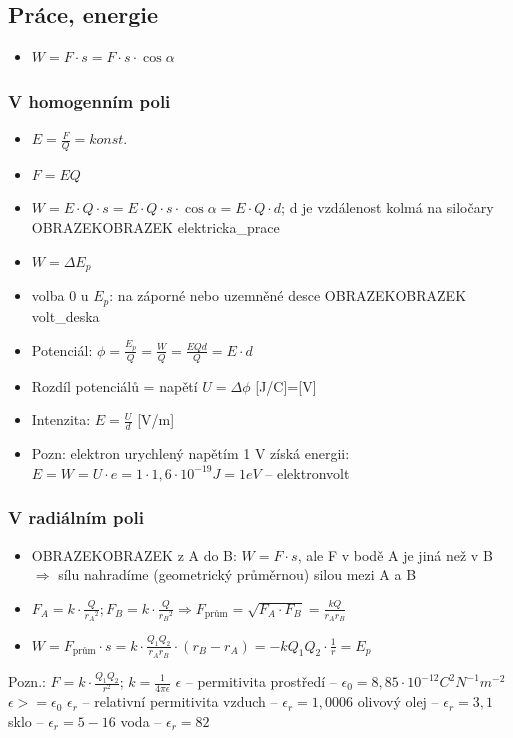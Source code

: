 \documentclass{article}
\begin{document}
\subsection{Práce, energie}
\begin{itemize}
  \item $W = F\cdot s = F\cdot s\cdot \cos \alpha $
\end{itemize}
\subsubsection{V homogenním poli}
\begin{itemize}
  \item $E = \frac{F}{Q} = konst.$
  \item $F = EQ$
  \item $W = E\cdot Q\cdot s = E\cdot Q\cdot s\cdot \cos \alpha = E\cdot Q\cdot d$; d je vzdálenost kolmá na siločary OBRAZEKOBRAZEK elektricka\_prace
  \item $W = \Delta E_p$
  \item volba 0 u $E_p$: na záporné nebo uzemněné desce OBRAZEKOBRAZEK volt\_deska
  \item Potenciál: $\phi = \frac{E_p}{Q} = \frac{W}{Q} = \frac{EQd}{Q} = E\cdot d$
  \item Rozdíl potenciálů = napětí $U = \Delta \phi$ [J/C]=[V]
  \item Intenzita: $E=\frac{U}{d}$ [V/m]
  \item Pozn: elektron urychlený napětím 1 V získá energii: $E = W = U\cdot e = 1\cdot 1,6\cdot 10^{-19}J = 1 eV$ -- elektronvolt
\end{itemize}
\subsubsection{V radiálním poli}
\begin{itemize}
  \item OBRAZEKOBRAZEK z A do B: $W = F \cdot s$, ale F v bodě A je jiná než v B $\Rightarrow$ sílu nahradíme  (geometrický průměrnou) silou mezi A a B
  \item $F_A = k \cdot \frac{Q}{{r_A}^2}; F_B = k \cdot \frac{Q}{{r_B}^2} \Rightarrow F_{\text{prům}} = \sqrt{F_A \cdot F_B} = \frac{kQ}{r_A r_B}$
  \item $W = F_{\text{prům}}\cdot s = k \cdot \frac{Q_1 Q_2}{r_A r_B}\cdot (r_{B}-r_A) = -kQ_1 Q_2\cdot \frac{1}{r} = E_p$
\end{itemize}
Pozn.: $F = k\cdot\frac{Q_1 Q_2}{r^2}$; $k = \frac{1}{4 \pi \epsilon}$
$\epsilon$ -- permitivita prostředí -- 
$\epsilon_0 = 8,85 \cdot 10^{-12} C^2 N^{-1} m^{-2}$
$\epsilon >= \epsilon_0$
$\epsilon_r$ -- relativní permitivita
vzduch -- $\epsilon_r = 1,0006$
olivový olej -- $\epsilon_r = 3,1$
sklo -- $\epsilon_r = 5-16$
voda -- $\epsilon_r = 82$
\end{document}
